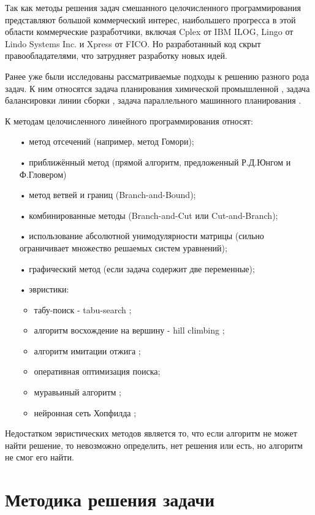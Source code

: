 \documentclass[a4paper,14pt,russian]{extreport}
\begin{document}
Так как методы решения задач смешанного целочисленного программирования представляют большой коммерческий интерес, наибольшего прогресса в этой области коммерческие разработчики, включая Cplex от IBM ILOG, Lingo от Lindo Systems Inc. и Xpress от FICO. Но разработанный код скрыт правообладателями, что затрудняет разработку новых идей. 
\par Ранее уже были исследованы рассматриваемые подходы к решению разного рода задач. К ним относятся задача планирования химической промышленной \cite{timpe}, задача балансировки линии сборки \cite{bockmayr_pisaruk}, задача параллельного машинного планирования \cite{jain_grossmann}.
\par К методам целочисленного линейного программирования относят:
  \begin{itemize}
  \item[•] метод отсечений (например, метод Гомори);
  \item[•] приближённый метод (прямой алгоритм, предложенный Р.Д.Юнгом и Ф.Гловером)
  \item[•] метод ветвей и границ (Branch-and-Bound);
  \item[•] комбинированные методы (Branch-and-Cut или Cut-and-Branch);
  \item[•] использование абсолютной унимодулярности матрицы (сильно ограничивает множество решаемых систем уравнений);
  \item[•] графический метод (если задача содержит две переменные);
  \item[•] эвристики:
    \begin{itemize}
    \item табу-поиск - tabu-search \cite{glover};
    \item алгоритм восхождение на вершину - hill climbing \cite{russell};
    \item алгоритм имитации отжига \cite{kirkpatrick};
    \item оперативная оптимизация поиска;
    \item муравьиный алгоритм \cite{colorni};
    \item нейронная сеть Хопфилда \cite{lau};
    \end{itemize}
  \end{itemize}
\par Недостатком эвристических методов является то, что если алгоритм не может найти решение, то невозможно определить, нет решения или есть, но алгоритм не смог его найти. 


\chapter{Методика решения задачи}
\end{document}
